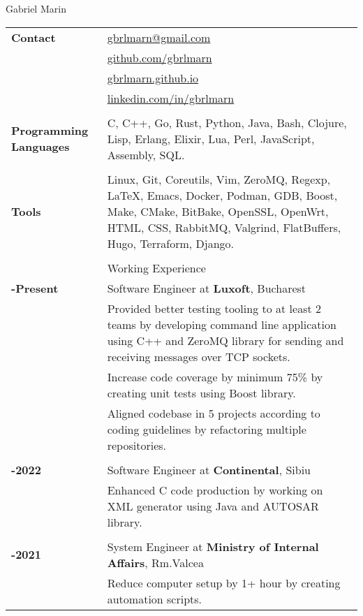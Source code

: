 \documentclass[a4paper,12pt]{article}
\begin{document}
\par {
  {\Huge Gabriel Marin}
  \bigskip
}

\begin{tabular}{>{\raggedleft\bfseries\arraybackslash}p{3cm}|>{\raggedright\arraybackslash}p{15cm}}
    Contact
    &\href{mailto:gbrlmarn@gmail.com}{gbrlmarn@gmail.com}\\
    &\href{https://github.com/gbrlmarn}{github.com/gbrlmarn}\\
    &\href{https://gbrlmarn.github.io}{gbrlmarn.github.io}\\
    &\href{https://linkedin.com/in/gbrlmarn}{linkedin.com/in/gbrlmarn}\\
    \\
Programming Languages & C, C++, Go, Rust, Python, Java, Bash, Clojure, Lisp, Erlang, Elixir, Lua, Perl, JavaScript, Assembly, SQL. \\
\\
Tools & Linux, Git, Coreutils, Vim, ZeroMQ, Regexp, \LaTeX, Emacs, Docker, Podman, GDB, Boost, Make, CMake, BitBake, OpenSSL, OpenWrt, HTML, CSS, RabbitMQ, Valgrind, FlatBuffers, Hugo, Terraform, Django. \\
\\
  & Working Experience \\
  2022-Present & Software Engineer at \textbf{Luxoft}, Bucharest\\
  &\footnotesize{Provided better testing tooling to at least 2 teams by developing command line application using C++ and ZeroMQ library for sending and receiving messages over TCP sockets.}\\
  &\footnotesize{Increase code coverage by minimum 75\% by creating unit tests using Boost library.}\\
  &\footnotesize{Aligned codebase in 5 projects according to coding guidelines by refactoring multiple repositories.}\\
  \\
  2021-2022 &Software Engineer at \textbf{Continental}, Sibiu\\
  &\footnotesize{Enhanced C code production by working on XML generator using Java and AUTOSAR library.}\\
  \\
  2019-2021 & System Engineer at \textbf{Ministry of Internal Affairs}, Rm.Valcea\\
  &\footnotesize{Reduce computer setup by 1+ hour by creating automation scripts.}\\

\end{tabular}
\end{document}
